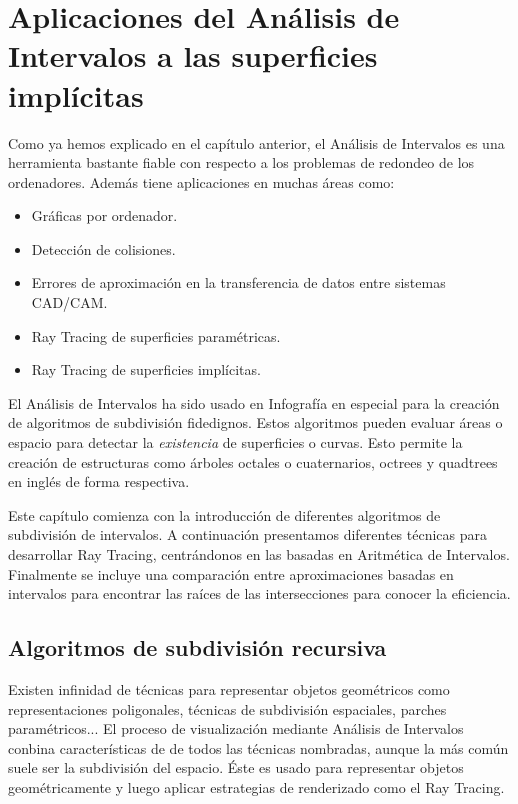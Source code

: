 \chapter{Aplicaciones del Análisis de Intervalos a las superficies implícitas}

Como ya hemos explicado en el capítulo anterior, el Análisis de Intervalos es una herramienta bastante fiable con respecto a los problemas de redondeo de los ordenadores. Además tiene aplicaciones en muchas áreas como:
\begin{itemize}
	\item Gráficas por ordenador.
	\item Detección de colisiones.
	\item Errores de aproximación en la transferencia de datos entre sistemas CAD/CAM.
	\item Ray Tracing de superficies paramétricas.
	\item Ray Tracing de superficies implícitas.
\end{itemize}

El Análisis de Intervalos ha sido usado en Infografía en especial para la creación de algoritmos de subdivisión fidedignos. Estos algoritmos pueden evaluar áreas o espacio para detectar la{ \em existencia} de superficies o curvas. Esto permite la creación de estructuras como árboles octales o cuaternarios, octrees y quadtrees en inglés de forma respectiva.

Este capítulo comienza con la introducción de diferentes algoritmos de subdivisión de intervalos. A continuación presentamos diferentes técnicas para desarrollar Ray Tracing, centrándonos en las basadas en Aritmética de Intervalos. Finalmente se incluye una comparación entre aproximaciones basadas en intervalos para encontrar las raíces de las intersecciones para conocer la eficiencia.

\section{Algoritmos de subdivisión recursiva}

Existen infinidad de técnicas para representar objetos geométricos como representaciones poligonales, técnicas de subdivisión espaciales, parches paramétricos... El proceso de visualización mediante Análisis de Intervalos conbina características de de todos las técnicas nombradas, aunque la más común suele ser la subdivisión del espacio. Éste es usado para representar objetos geométricamente  y luego aplicar estrategias de renderizado como el Ray Tracing.

